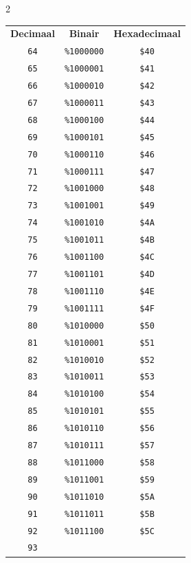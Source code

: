 \begin{multicols}{2}
  \begin{center}
  \begin{tabular}{|c|c|c|}
  \hline
		\textbf{Decimaal} & \textbf{Binair} & \textbf{Hexadecimaal} \\ \hhline{|=|=|=|}     \texttt{64} & \texttt{\%1000000} &  \texttt{\$40} \\ \hline \texttt{65} & \texttt{\%1000001} &  \texttt{\$41} \\ \hline \texttt{66} & \texttt{\%1000010} &  \texttt{\$42} \\ \hline \texttt{67} & \texttt{\%1000011} &  \texttt{\$43} \\ \hline \texttt{68} & \texttt{\%1000100} &  \texttt{\$44} \\ \hline \texttt{69} & \texttt{\%1000101} &  \texttt{\$45} \\ \hline \texttt{70} & \texttt{\%1000110} &  \texttt{\$46} \\ \hline \texttt{71} & \texttt{\%1000111} &  \texttt{\$47} \\ \hline \texttt{72} & \texttt{\%1001000} &  \texttt{\$48} \\ \hline \texttt{73} & \texttt{\%1001001} &  \texttt{\$49} \\ \hline \texttt{74} & \texttt{\%1001010} &  \texttt{\$4A} \\ \hline \texttt{75} & \texttt{\%1001011} &  \texttt{\$4B} \\ \hline \texttt{76} & \texttt{\%1001100} &  \texttt{\$4C} \\ \hline \texttt{77} & \texttt{\%1001101} &  \texttt{\$4D} \\ \hline \texttt{78} & \texttt{\%1001110} &  \texttt{\$4E} \\ \hline \texttt{79} & \texttt{\%1001111} &  \texttt{\$4F} \\ \hline \texttt{80} & \texttt{\%1010000} &  \texttt{\$50} \\ \hline \texttt{81} & \texttt{\%1010001} &  \texttt{\$51} \\ \hline \texttt{82} & \texttt{\%1010010} &  \texttt{\$52} \\ \hline \texttt{83} & \texttt{\%1010011} &  \texttt{\$53} \\ \hline \texttt{84} & \texttt{\%1010100} &  \texttt{\$54} \\ \hline \texttt{85} & \texttt{\%1010101} &  \texttt{\$55} \\ \hline \texttt{86} & \texttt{\%1010110} &  \texttt{\$56} \\ \hline \texttt{87} & \texttt{\%1010111} &  \texttt{\$57} \\ \hline \texttt{88} & \texttt{\%1011000} &  \texttt{\$58} \\ \hline \texttt{89} & \texttt{\%1011001} &  \texttt{\$59} \\ \hline \texttt{90} & \texttt{\%1011010} &  \texttt{\$5A} \\ \hline \texttt{91} & \texttt{\%1011011} &  \texttt{\$5B} \\ \hline \texttt{92} & \texttt{\%1011100} &  \texttt{\$5C} \\ \hline \texttt{93} & 
\end{tabular}
\end{center}
\end{multicols}
